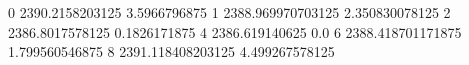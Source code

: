 0 2390.2158203125 3.5966796875
1 2388.969970703125 2.350830078125
2 2386.8017578125 0.1826171875
4 2386.619140625 0.0
6 2388.418701171875 1.799560546875
8 2391.118408203125 4.499267578125
